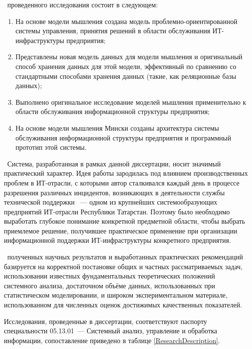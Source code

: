 \novelty\ проведенного исследования состоит в следующем:
\begin{enumerate}
  \item На основе модели мышления создана модель проблемно-ориентированной системы управления, принятия решений в области обслуживания ИТ-инфраструктуры предприятия;
  \item Представлены новая модель данных для модели мышления и оригинальный способ хранения данных для этой модели, эффективный по сравнению со стандартными способами хранения данных (такие, как реляционные базы данных);
  \item Выполнено оригинальное исследование моделей мышления применительно к области обслуживания информационной структуры предприятия;
  \item На основе модели мышления Мински созданы архитектура системы обслуживания информационной структуры предприятия и программный прототип этой системы.
\end{enumerate}

\influence\ 
Система, разработанная в рамках данной диссертации, носит значимый практический характер. Идея работы зародилась под влиянием производственных проблем в ИТ-отрасли, с которыми автор сталкивался каждый день в процессе разрешения различных инцидентов, возникающих в деятельности службы технической поддержки \icl~--- одном из крупнейших системообразующих предприятий ИТ-отрасли Республики Татарстан. Поэтому было необходимо выработать глубокое понимание конкретной предметной области, чтобы выбрать приемлемое решение, получившее практическое применение при организации информационной поддержки ИТ-инфраструктуры конкретного предприятия. \par
\reliability\ полученных научных результатов и выработанных практических рекомендаций базируется на корректной постановке общих и частных рассматриваемых задач,  использовании известных фундаментальных теоретических положений системного анализа, достаточном объёме данных, использованных при статистическом моделировании, и широком экспериментальном материале, использованном для численных оценок достижимых качественных показателей. \par 
Исследования, проведенные в диссертации, соответствуют паспорту специальности 05.13.01~--- Системный анализ, управление и обработка информации, сопоставление приведено в таблице \ref{ResearchDescription}.

